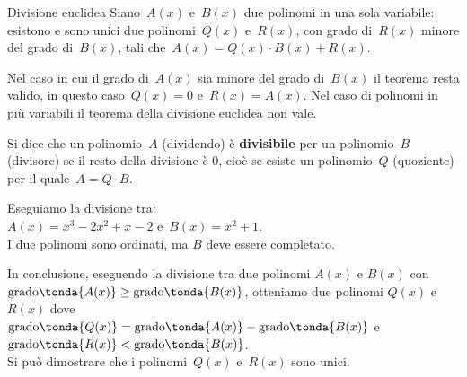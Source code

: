 \begin{teorema}{Divisione euclidea}{}
Siano~\(A(x)\) e~\(B(x)\) due polinomi in una sola variabile: esistono 
e sono unici due polinomi~\(Q(x)\) e~\(R(x)\), con grado di~\(R(x)\)
minore del grado di~\(B(x)\), tali che~\(A(x)=Q(x)\cdot B(x)+R(x)\).
\end{teorema}

\begin{osservazione}{}{} 
Nel caso in cui il grado di~\(A(x)\) sia minore del grado di~\(B(x)\) 
il teorema resta valido, in questo caso~\(Q(x)=0\) e~\(R(x)=A(x)\).
Nel caso di polinomi in più variabili il teorema della divisione 
euclidea non vale.
\end{osservazione}

\begin{definizione}{}{}
Si dice che un polinomio~\(A\) (dividendo) è
 \textbf{divisibile} per 
un polinomio~\(B\)  (divisore) se il resto della divisione è \(0\), cioè
se esiste un polinomio~\(Q\) (quoziente) per il quale~\(A = Q \cdot B\).
\end{definizione}

\begin{esempio}{}{}
Eseguiamo la divisione tra: \\
\(A(x)=x^3-2x^2+x-2\) e~\(B(x)=x^2+1\).\\

I due polinomi sono ordinati, ma \(B\) deve essere completato. 

\end{esempio}

In conclusione, eseguendo la divisione tra due polinomi 
\(A(x)\) e \(B(x)\) con \\
\(\text{grado}\tonda{A(x)} \ge \text{grado}\tonda{B(x)}\), 
otteniamo due polinomi \(Q(x)\) e \(R(x)\) dove \\
\(\text{grado}\tonda{Q(x)} = \text{grado}\tonda{A(x)} - 
\text{grado}\tonda{B(x)}\) e 
\(\text{grado}\tonda{R(x)} < \text{grado}\tonda{B(x)}\).\\
Si può dimostrare che i polinomi~\(Q(x)\) e~\(R(x)\) sono unici.


